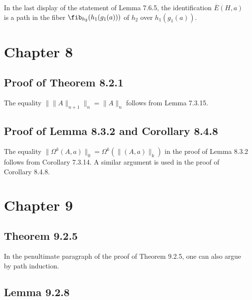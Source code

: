 \documentclass[12pt]{article}
\begin{document}
In the last display of the statement of Lemma 7.6.5, the identification $\overline{E}(H,a)$ is a path in the fiber $\fib_{h_2}(h_1(g_1(a)))$ of $h_2$ over $h_1(g_1(a))$.


\section{Chapter 8}




\subsection{Proof of Theorem 8.2.1}

The equality $\lVert\lVert A\rVert_{n+1}\rVert_n=\lVert A\rVert_n$ follows from Lemma 7.3.15.


\subsection{Proof of Lemma 8.3.2 and Corollary 8.4.8}

The equality $\lVert\Omega^k(A,a)\rVert_0=\Omega^k(\lVert(A,a)\rVert_k)$ in the proof of Lemma 8.3.2 follows from Corollary 7.3.14. A similar argument is used in the proof of Corollary 8.4.8.


\section{Chapter 9}

\subsection{Theorem 9.2.5}

In the penultimate paragraph of the proof of Theorem 9.2.5, one can also argue by path induction.


\subsection{Lemma 9.2.8}\label{928}
\end{document}
